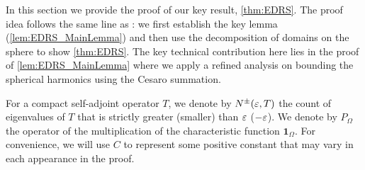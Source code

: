 In this section we provide the proof of our key result, \cref{thm:EDRS}.
The proof idea follows the same line as \citet{widom1963_AsymptoticBehavior}:
we first establish the key lemma (\cref{lem:EDRS_MainLemma}) and then use the decomposition of domains on the sphere to show \cref{thm:EDRS}.
The key technical contribution here lies in the proof of \cref{lem:EDRS_MainLemma} where
we apply a refined analysis on bounding the spherical harmonics using the Cesaro summation.


For a compact self-adjoint operator $T$, we denote by $N^{\pm}(\varepsilon,T)$ the count of eigenvalues of $T$
that is strictly greater (smaller) than $\varepsilon$ ($-\varepsilon$).
We denote by $P_{\Omega}$ the operator of the multiplication of the characteristic function $\bm{1}_{\Omega}$.
For convenience, we will use $C$ to represent some positive constant that may vary in each appearance in the proof.

